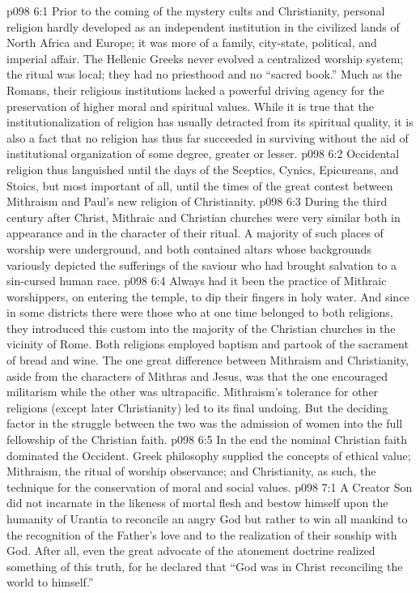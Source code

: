 \vs p098 6:1 Prior to the coming of the mystery cults and Christianity, personal religion hardly developed as an independent institution in the civilized lands of North Africa and Europe; it was more of a family, city\hyp{}state, political, and imperial affair. The Hellenic Greeks never evolved a centralized worship system; the ritual was local; they had no priesthood and no “sacred book.” Much as the Romans, their religious institutions lacked a powerful driving agency for the preservation of higher moral and spiritual values. While it is true that the institutionalization of religion has usually detracted from its spiritual quality, it is also a fact that no religion has thus far succeeded in surviving without the aid of institutional organization of some degree, greater or lesser.
\vs p098 6:2 Occidental religion thus languished until the days of the Sceptics, Cynics, Epicureans, and Stoics, but most important of all, until the times of the great contest between Mithraism and Paul’s new religion of Christianity.
\vs p098 6:3 \pc During the third century after Christ, Mithraic and Christian churches were very similar both in appearance and in the character of their ritual. A majority of such places of worship were underground, and both contained altars whose backgrounds variously depicted the sufferings of the saviour who had brought salvation to a sin\hyp{}cursed human race.
\vs p098 6:4 Always had it been the practice of Mithraic worshippers, on entering the temple, to dip their fingers in holy water. And since in some districts there were those who at one time belonged to both religions, they introduced this custom into the majority of the Christian churches in the vicinity of Rome. Both religions employed baptism and partook of the sacrament of bread and wine. The one great difference between Mithraism and Christianity, aside from the characters of Mithras and Jesus, was that the one encouraged militarism while the other was ultrapacific. Mithraism’s tolerance for other religions (except later Christianity) led to its final undoing. But the deciding factor in the struggle between the two was the admission of women into the full fellowship of the Christian faith.
\vs p098 6:5 \pc In the end the nominal Christian faith dominated the Occident. Greek philosophy supplied the concepts of ethical value; Mithraism, the ritual of worship observance; and Christianity, as such, the technique for the conservation of moral and social values.
\vs p098 7:1 A Creator Son did not incarnate in the likeness of mortal flesh and bestow himself upon the humanity of Urantia to reconcile an angry God but rather to win all mankind to the recognition of the Father’s love and to the realization of their sonship with God. After all, even the great advocate of the atonement doctrine realized something of this truth, for he declared that “God was in Christ reconciling the world to himself.”
